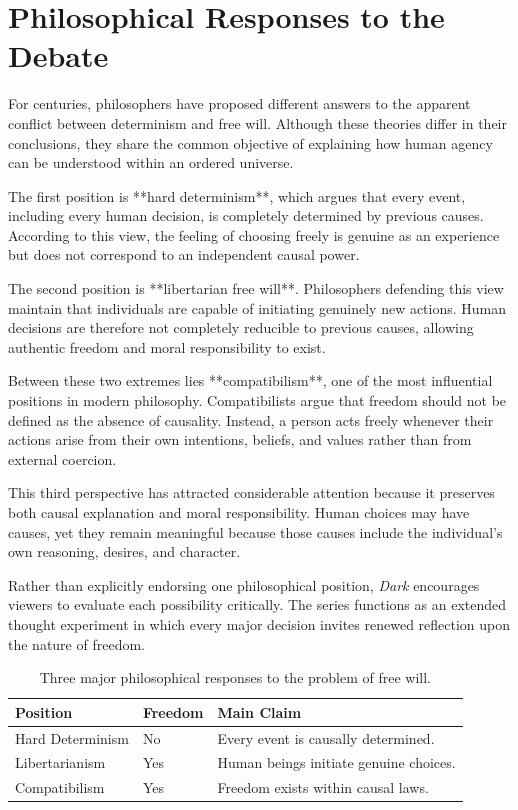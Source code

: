 \documentclass[12pt,oneside,openany]{book}
\begin{document}
\section{Philosophical Responses to the Debate}

For centuries, philosophers have proposed different answers to the apparent
conflict between determinism and free will. Although these theories differ in
their conclusions, they share the common objective of explaining how human
agency can be understood within an ordered universe.

The first position is **hard determinism**, which argues that every event,
including every human decision, is completely determined by previous causes.
According to this view, the feeling of choosing freely is genuine as an
experience but does not correspond to an independent causal power.

The second position is **libertarian free will**. Philosophers defending this
view maintain that individuals are capable of initiating genuinely new actions.
Human decisions are therefore not completely reducible to previous causes,
allowing authentic freedom and moral responsibility to exist.

Between these two extremes lies **compatibilism**, one of the most influential
positions in modern philosophy. Compatibilists argue that freedom should not be
defined as the absence of causality. Instead, a person acts freely whenever
their actions arise from their own intentions, beliefs, and values rather than
from external coercion.

This third perspective has attracted considerable attention because it
preserves both causal explanation and moral responsibility. Human choices may
have causes, yet they remain meaningful because those causes include the
individual's own reasoning, desires, and character.

Rather than explicitly endorsing one philosophical position, \textit{Dark}
encourages viewers to evaluate each possibility critically. The series
functions as an extended thought experiment in which every major decision
invites renewed reflection upon the nature of freedom.

\begin{table}[H]
\centering
\begin{tabular}{|p{3.8cm}|p{3.8cm}|p{4.2cm}|}
\hline
\textbf{Position} & \textbf{Freedom} & \textbf{Main Claim}\\
\hline
Hard Determinism & No & Every event is causally determined.\\
\hline
Libertarianism & Yes & Human beings initiate genuine choices.\\
\hline
Compatibilism & Yes & Freedom exists within causal laws.\\
\hline
\end{tabular}
\caption{Three major philosophical responses to the problem of free will.}
\end{table}
\end{document}
